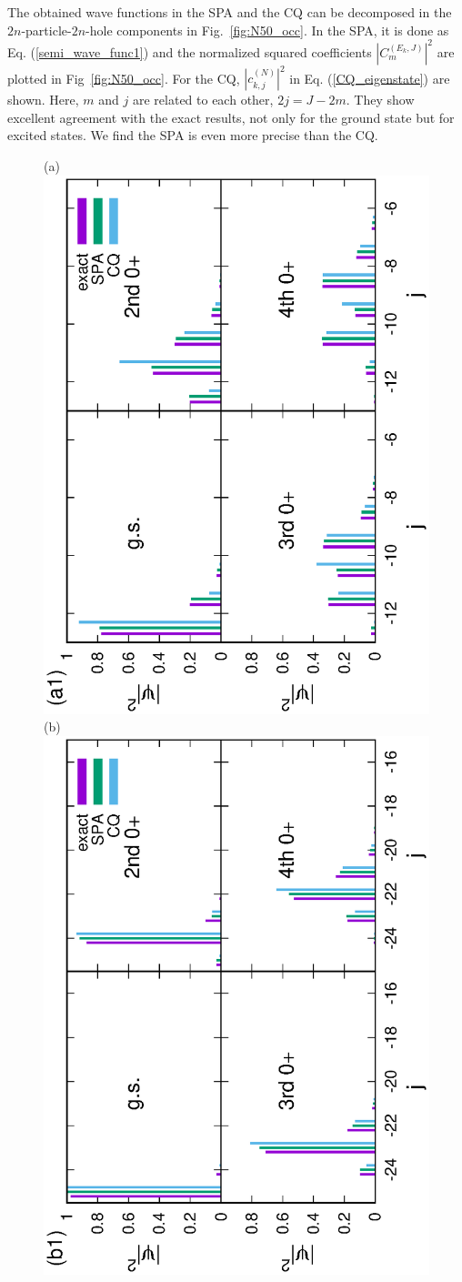 \documentclass[%
superscriptaddress,
preprint,
showpacs,
nofootinbib,
amsmath,amssymb,
aps,
prc,
floatfix ]%
{revtex4-1}
\begin{document}
The obtained wave functions in the SPA and the CQ can be decomposed in the
$2n$-particle-$2n$-hole components in Fig.~\ref{fig:N50_occ}.
In the SPA, it is done as Eq. (\ref{semi_wave_func1}) and
the normalized squared coefficients $|C_m^{(E_k,J)}|^2$ are plotted
in Fig~\ref{fig:N50_occ}.
For the CQ, $|c_{k,j}^{(N)}|^2$ in Eq. (\ref{CQ_eigenstate}) are shown.
Here, $m$ and $j$ are related to each other, $2j=J-2m$.
They show excellent agreement with the exact results, not only for the
ground state but for excited states.
We find the SPA is even more precise than the CQ.
\begin{figure}[t]
 \begin{minipage}{1\hsize}
 \begin{center}
(a)\includegraphics[height=0.45\textwidth,angle=-90]{N50Xeq0p5occ_wo_adiabatic.eps}
(b)\includegraphics[height=0.45\textwidth,angle=-90]{N100Xeq0p5occ_wo_adiabatic.eps}
 \end{center}
 \end{minipage}
 \begin{minipage}{1\hsize}
 \begin{center}

\end{center}
\end{minipage}
\end{figure}
\end{document}
